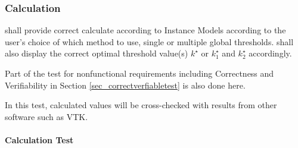 \documentclass[12pt, titlepage]{article}
\begin{document}
\subsubsection{Calculation}
\label{sec_caltest}
\progname{} shall provide correct calculate according to Instance Models according to the user's choice of which method to use, single or multiple global thresholds. \progname{} shall also display the correct optimal threshold value(s) $k^{\star}$ or $k^{\star}_{1}$ and $k^{\star}_{2}$ accordingly.

Part of the test for nonfunctional requirements including Correctness and Verifiability in Section \ref{sec_correctverfiabletest} is also done here.

In this test, calculated values will be cross-checked with results from other software such as VTK.
		
\paragraph{Calculation Test}
\end{document}
